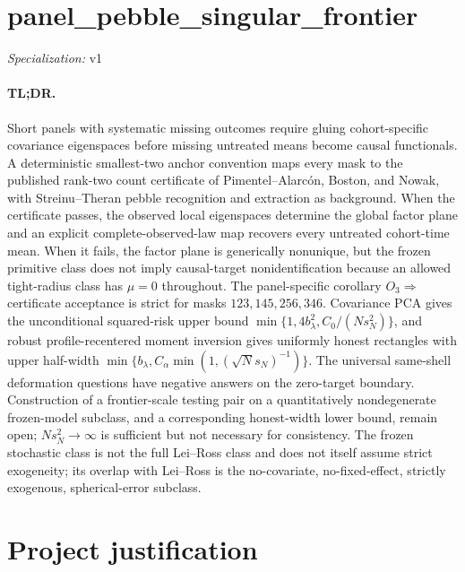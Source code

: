 \documentclass{article}
\begin{document}
\sloppy

\section*{panel\_\allowbreak{}pebble\_\allowbreak{}singular\_\allowbreak{}frontier}

\noindent\textit{Specialization:} v1\par

\paragraph{TL;DR.} Short panels with systematic missing outcomes require gluing cohort-specific covariance eigenspaces before missing untreated means become causal functionals. A deterministic smallest-two anchor convention maps every mask to the published rank-two count certificate of Pimentel--Alarcón, Boston, and Nowak, with Streinu--Theran pebble recognition and extraction as background. When the certificate passes, the observed local eigenspaces determine the global factor plane and an explicit complete-observed-law map recovers every untreated cohort-time mean. When it fails, the factor plane is generically nonunique, but the frozen primitive class does not imply causal-target nonidentification because an allowed tight-radius class has \(\mu=0\) throughout. The panel-specific corollary \(O_3\Rightarrow\) certificate acceptance is strict for masks \(123,145,256,346\). Covariance PCA gives the unconditional squared-risk upper bound \(\min\{1,4b_\lambda^2,C_0/(Ns_N^2)\}\), and robust profile-recentered moment inversion gives uniformly honest rectangles with upper half-width \(\min\{b_\lambda,C_\alpha\min(1,(\sqrt N s_N)^{-1})\}\). The universal same-shell deformation questions have negative answers on the zero-target boundary. Construction of a frontier-scale testing pair on a quantitatively nondegenerate frozen-model subclass, and a corresponding honest-width lower bound, remain open; \(Ns_N^2\to\infty\) is sufficient but not necessary for consistency. The frozen stochastic class is not the full Lei--Ross class and does not itself assume strict exogeneity; its overlap with Lei--Ross is the no-covariate, no-fixed-effect, strictly exogenous, spherical-error subclass.

\section{Project justification}
\end{document}
